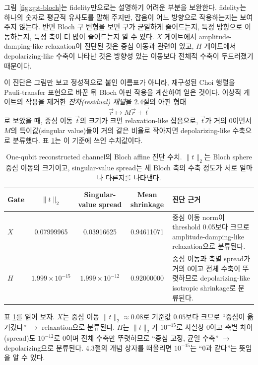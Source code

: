 \documentclass[11pt,a4paper]{article}
\begin{document}
그림 \ref{fig:qpt-bloch}는 fidelity만으로는 설명하기 어려운 부분을 보완한다. fidelity는 하나의 숫자로 평균적 유사도를 말해 주지만, 잡음이 어느 방향으로 작용하는지는 보여주지 않는다. 반면 Bloch 구 변형을 보면 구가 균일하게 줄어드는지, 특정 방향으로 이동하는지, 특정 축이 더 많이 줄어드는지 알 수 있다. $X$ 게이트에서 amplitude-damping-like relaxation이 진단된 것은 중심 이동과 관련이 있고, $H$ 게이트에서 depolarizing-like 수축이 나타난 것은 방향성 있는 이동보다 전체적 수축이 두드러졌기 때문이다.

이 진단은 그림만 보고 정성적으로 붙인 이름표가 아니라, 재구성된 Choi 행렬을 Pauli-transfer 표현으로 바꾼 뒤 Bloch 아핀 작용을 계산하여 얻은 것이다. 이상적 게이트의 작용을 제거한 \emph{잔차(residual) 채널}을 2.4절의 아핀 형태
\[
\vec r\mapsto M\vec r+\vec t
\]
로 보았을 때, 중심 이동 $\vec t$의 크기가 크면 relaxation-like 잡음으로, $\vec t$가 거의 0이면서 $M$의 특이값(singular value)들이 거의 같은 비율로 작아지면 depolarizing-like 수축으로 분류했다. 표 \ref{tab:qpt-bloch-diagnostics}는 이 기준에 쓰인 수치값이다.

\begin{table}[H]
\centering
\small
\begin{tabularx}{\textwidth}{lcccX}
\toprule
Gate & $\|t\|_2$ & Singular-value spread & Mean shrinkage & 진단 근거 \\
\midrule
$X$ & 0.07999965 & 0.03916625 & 0.94611071 & 중심 이동 norm이 threshold 0.05보다 크므로 amplitude-damping-like relaxation으로 분류된다. \\
$H$ & $1.999\times10^{-15}$ & $1.999\times10^{-12}$ & 0.92000000 & 중심 이동과 축별 spread가 거의 0이고 전체 수축이 뚜렷하므로 depolarizing-like isotropic shrinkage로 분류된다. \\
\bottomrule
\end{tabularx}
\caption{One-qubit reconstructed channel의 Bloch affine 진단 수치. $\|t\|_2$는 Bloch sphere 중심 이동의 크기이고, singular-value spread는 세 Bloch 축의 수축 정도가 서로 얼마나 다른지를 나타낸다.}
\label{tab:qpt-bloch-diagnostics}
\end{table}

표 \ref{tab:qpt-bloch-diagnostics}를 읽어 보자. $X$는 중심 이동 $\|t\|_2\approx0.08$로 기준값 $0.05$보다 크므로 ``중심이 옮겨갔다'' $\to$ relaxation으로 분류된다. $H$는 $\|t\|_2$가 $10^{-15}$로 사실상 0이고 축별 차이(spread)도 $10^{-12}$로 0이며 전체 수축만 뚜렷하므로 ``중심 고정, 균일 수축'' $\to$ depolarizing으로 분류된다. 4.3절의 개념 상자를 떠올리면 $10^{-15}$는 ``0과 같다''는 뜻임을 알 수 있다.
\end{document}
